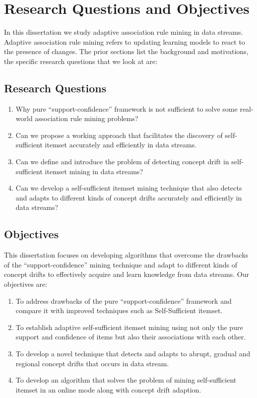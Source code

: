 \section{Research Questions and Objectives}
In this dissertation we study adaptive association rule mining in data streams. Adaptive association rule mining refers to updating learning models to react to the presence of changes. The prior sections list the background and motivations, the specific research questions that we look at are:

\subsection{Research Questions}
\begin{enumerate}
\item Why pure ``support-confidence'' framework is not sufficient to solve some real-world association rule mining problems?

\item Can we propose a working approach that facilitates the discovery of self-sufficient itemset accurately and efficiently in data streams.

\item Can we define and introduce the problem of detecting concept drift in self-sufficient itemset mining in data streams?

\item Can we develop a self-sufficient itemset mining technique that also detects and adapts to different kinds of concept drifts accurately and efficiently in data streams?
\end{enumerate}

\subsection{Objectives}
This dissertation focuses on developing algorithms that overcome the drawbacks of the ``support-confidence'' mining technique and adapt to different kinds of concept drifts to effectively acquire and learn knowledge from data streams. Our objectives are:

\begin{enumerate}
\item To address drawbacks of the pure ``support-confidence'' framework and compare it with improved techniques such as Self-Sufficient itemset.

\item To establish adaptive self-sufficient itemset mining using not only the pure support and confidence of items but also their associations with each other.

\item To develop a novel technique that detects and adapts to abrupt, gradual and regional concept drifts that occurs in data stream.

\item To develop an algorithm that solves the problem of mining self-sufficient itemset in an online mode along with concept drift adaption.
\end{enumerate}

